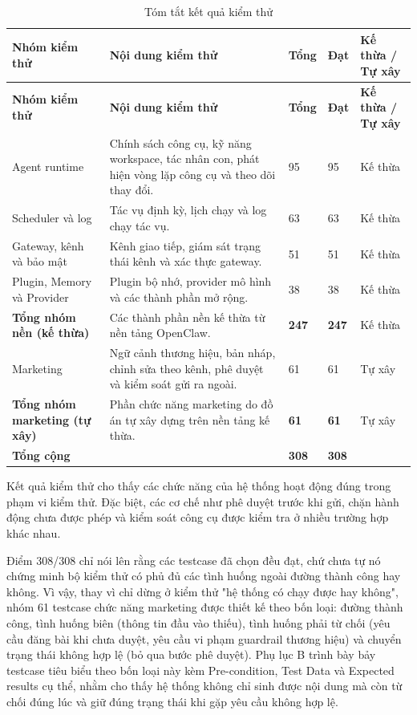 \documentclass[a4paper]{article}
\renewcommand{\arraystretch}{1.25}
\begin{document}
\renewcommand{\arraystretch}{1.25}
\begin{longtable}{L{0.24\textwidth}L{0.30\textwidth}L{0.08\textwidth}L{0.08\textwidth}L{0.14\textwidth}}
\caption{Tóm tắt kết quả kiểm thử}\\
\toprule
\textbf{Nhóm kiểm thử} & \textbf{Nội dung kiểm thử} & \textbf{Tổng} & \textbf{Đạt} & \textbf{Kế thừa / Tự xây}\\
\midrule
\endfirsthead
\toprule
\textbf{Nhóm kiểm thử} & \textbf{Nội dung kiểm thử} & \textbf{Tổng} & \textbf{Đạt} & \textbf{Kế thừa / Tự xây}\\
\midrule
\endhead

Agent runtime & Chính sách công cụ, kỹ năng workspace, tác nhân con, phát hiện vòng lặp công cụ và theo dõi thay đổi. & 95 & 95 & Kế thừa\\
Scheduler và log & Tác vụ định kỳ, lịch chạy và log chạy tác vụ. & 63 & 63 & Kế thừa\\
Gateway, kênh và bảo mật & Kênh giao tiếp, giám sát trạng thái kênh và xác thực gateway. & 51 & 51 & Kế thừa\\
Plugin, Memory và Provider & Plugin bộ nhớ, provider mô hình và các thành phần mở rộng. & 38 & 38 & Kế thừa\\
\midrule
\textbf{Tổng nhóm nền (kế thừa)} & Các thành phần nền kế thừa từ nền tảng OpenClaw. & \textbf{247} & \textbf{247} & Kế thừa\\
\midrule
Marketing & Ngữ cảnh thương hiệu, bản nháp, chỉnh sửa theo kênh, phê duyệt và kiểm soát gửi ra ngoài. & 61 & 61 & Tự xây\\
\textbf{Tổng nhóm marketing (tự xây)} & Phần chức năng marketing do đồ án tự xây dựng trên nền tảng kế thừa. & \textbf{61} & \textbf{61} & Tự xây\\
\midrule
\textbf{Tổng cộng} & & \textbf{308} & \textbf{308} & \\
\bottomrule
\end{longtable}
\renewcommand{\arraystretch}{1}

Kết quả kiểm thử cho thấy các chức năng của hệ thống hoạt động đúng trong phạm vi kiểm thử. Đặc biệt, các cơ chế như phê duyệt trước khi gửi, chặn hành động chưa được phép và kiểm soát công cụ được kiểm tra ở nhiều trường hợp khác nhau.

Điểm 308/308 chỉ nói lên rằng các testcase đã chọn đều đạt, chứ chưa tự nó chứng minh bộ kiểm thử có phủ đủ các tình huống ngoài đường thành công hay không. Vì vậy, thay vì chỉ dừng ở kiểm thử "hệ thống có chạy được hay không", nhóm 61 testcase chức năng marketing được thiết kế theo bốn loại: đường thành công, tình huống biên (thông tin đầu vào thiếu), tình huống phải từ chối (yêu cầu đăng bài khi chưa duyệt, yêu cầu vi phạm guardrail thương hiệu) và chuyển trạng thái không hợp lệ (bỏ qua bước phê duyệt). Phụ lục B trình bày bảy testcase tiêu biểu theo bốn loại này kèm Pre-condition, Test Data và Expected results cụ thể, nhằm cho thấy hệ thống không chỉ sinh được nội dung mà còn từ chối đúng lúc và giữ đúng trạng thái khi gặp yêu cầu không hợp lệ.
\end{document}
